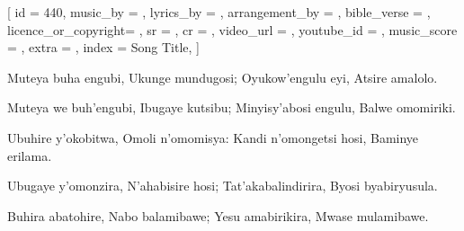 [
    id                  = {440},
    music_by            = {}, %
    lyrics_by           = {}, %
    arrangement_by      = {}, %
    bible_verse         = {},
    licence_or_copyright= {},
    sr                  = {},
    cr                  = {},
    video_url           = {}, %
    youtube_id          = {}, %
    music_score         = {}, %
    extra               = {},
    index               = {Song Title},
]

\beginverse
Muteya buha engubi, Ukunge mundugosi;
Oyukow'engulu eyi, Atsire amalolo.
\endverse

\beginchorus
Muteya we buh'engubi, Ibugaye kutsibu;
Minyisy'abosi engulu, Balwe omomiriki.
\endchorus

\beginverse
Ubuhire y'okobitwa, Omoli n'omomisya:
Kandi n'omongetsi hosi, Baminye erilama.
\endverse

\beginverse
Ubugaye y'omonzira, N'ahabisire hosi;
Tat'akabalindirira, Byosi byabiryusula.
\endverse

\beginverse
Buhira abatohire, Nabo balamibawe;
Yesu amabirikira, Mwase mulamibawe.
\endverse

\endsong
